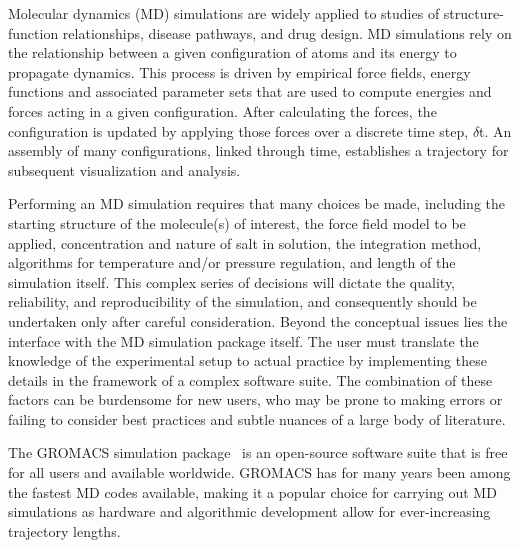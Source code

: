 \documentclass[9pt,tutorial]{livecoms}
\begin{document}


Molecular dynamics (MD) simulations are widely applied to studies of structure-function relationships, disease pathways, and drug design. MD simulations rely on the relationship between a given configuration of atoms and its energy to propagate dynamics. This process is driven by empirical force fields, energy functions and associated parameter sets that are used to compute energies and forces acting in a given configuration. After calculating the forces, the configuration is updated by applying those forces over a discrete time step, $\delta$t. An assembly of many configurations, linked through time, establishes a trajectory for subsequent visualization and analysis.

Performing an MD simulation requires that many choices be made, including the starting structure of the molecule(s) of interest, the force field model to be applied, concentration and nature of salt in solution, the integration method, algorithms for temperature and/or pressure regulation, and length of the simulation itself. This complex series of decisions will dictate the quality, reliability, and reproducibility of the simulation, and consequently should be undertaken only after careful consideration. Beyond the conceptual issues lies the interface with the MD simulation package itself. The user must translate the knowledge of the experimental setup to actual practice by implementing these details in the framework of a complex software suite. The combination of these factors can be burdensome for new users, who may be prone to making errors or failing to consider best practices and subtle nuances of a large body of literature.

The GROMACS simulation package~\cite{Hess2008,Abraham2015} is an open-source software suite that is free for all users and available worldwide. GROMACS has for many years been among the fastest MD codes available, making it a popular choice for carrying out MD simulations as hardware and algorithmic development allow for ever-increasing trajectory lengths.
\end{document}
